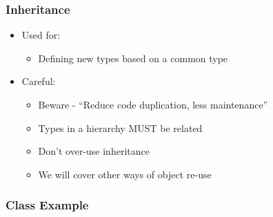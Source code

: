 \subsubsection{Inheritance}\label{inheritance}

\begin{itemize}
\itemsep1pt\parskip0pt
\item
  Used for:

  \begin{itemize}
  \itemsep1pt\parskip0pt
  \item
    Defining new types based on a common type
  \end{itemize}
\item
  Careful:

  \begin{itemize}
  \itemsep1pt\parskip0pt
  \item
    Beware - ``Reduce code duplication, less maintenance''
  \item
    Types in a hierarchy MUST be related
  \item
    Don't over-use inheritance
  \item
    We will cover other ways of object re-use
  \end{itemize}
\end{itemize}

\subsubsection{Class Example}\label{class-example-2}

